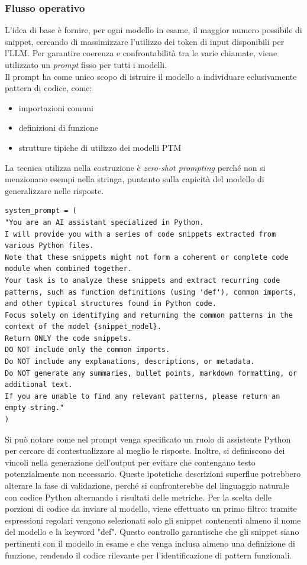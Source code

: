 \documentclass{article}
\begin{document}
\subsubsection{Flusso operativo}
L'idea di base è fornire, per ogni modello in esame, il maggior numero possibile di snippet, cercando di massimizzare l’utilizzo dei token di input disponibili per l’LLM. Per garantire coerenza e confrontabilità tra le varie chiamate, viene utilizzato un \textit{prompt} fisso per tutti i modelli. \\
Il prompt ha come unico scopo di istruire il modello a individuare eclusivamente pattern di codice, come:
\begin{itemize}
    \item importazioni comuni
    \item definizioni di funzione
    \item strutture tipiche di utilizzo dei modelli PTM
\end{itemize}
La tecnica utilizza nella costruzione è \textit{zero-shot prompting} perché non si menzionano esempi nella stringa, puntanto sulla capicità del modello di generalizzare nelle risposte.
\begin{lstlisting}
system_prompt = (
"You are an AI assistant specialized in Python.
I will provide you with a series of code snippets extracted from various Python files.
Note that these snippets might not form a coherent or complete code module when combined together.
Your task is to analyze these snippets and extract recurring code patterns, such as function definitions (using 'def'), common imports, and other typical structures found in Python code.
Focus solely on identifying and returning the common patterns in the context of the model {snippet_model}.
Return ONLY the code snippets.
DO NOT include only the common imports.
Do NOT include any explanations, descriptions, or metadata.
Do NOT generate any summaries, bullet points, markdown formatting, or additional text.
If you are unable to find any relevant patterns, please return an empty string."
)    
\end{lstlisting}
Si può notare come nel prompt venga specificato un ruolo di assistente Python per cercare di contestualizzare al meglio le risposte. Inoltre, si definiscono dei vincoli nella generazione dell'output per evitare che contengano testo potenzialmente non necessario. Queste ipotetiche descrizioni superflue potrebbero alterare la fase di validazione, perché si confronterebbe del linguaggio naturale con codice Python alternando i risultati delle metriche.
Per la scelta delle porzioni di codice da inviare al modello, viene effettuato un primo filtro: tramite espressioni regolari vengono selezionati solo gli snippet contenenti almeno il nome del modello e la keyword "def". Questo controllo garantische che gli snippet siano pertinenti con il modello in esame e che venga inclusa almeno una definizione di funzione, rendendo il codice rilevante per l'identificazione di pattern funzionali.\\
\end{document}
